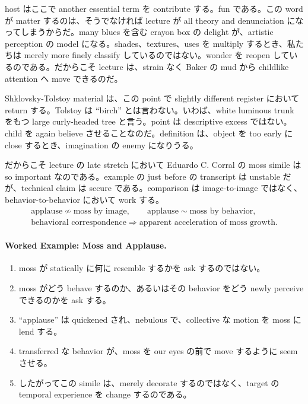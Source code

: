 host はここで another essential term を contribute する。fun である。この word が matter するのは、そうでなければ lecture が all theory and denunciation になってしまうからだ。many blues を含む crayon box の delight が、artistic perception の model になる。shades、textures、uses を multiply するとき、私たちは merely more finely classify しているのではない。wonder を reopen しているのである。だからこそ lecture は、strain なく Baker の mud から childlike attention へ move できるのだ。

Shklovsky-Tolstoy material は、この point で slightly different register において return する。Tolstoy は ``birch'' とは言わない。いわば、white luminous trunk をもつ large curly-headed tree と言う。point は descriptive excess ではない。child を again believe させることなのだ。definition は、object を too early に close するとき、imagination の enemy になりうる。

だからこそ lecture の late stretch において Eduardo C. Corral の moss simile は so important なのである。example の just before の transcript は unstable だが、technical claim は secure である。comparison は image-to-image ではなく、behavior-to-behavior において work する。
\begin{align}
\text{applause} \not\sim \text{moss by image}, \qquad \text{applause} \sim \text{moss by behavior},\\
\text{behavioral correspondence} \Longrightarrow \text{apparent acceleration of moss growth}.
\end{align}

\paragraph{Worked Example: Moss and Applause.}
\begin{enumerate}
\item moss が statically に何に resemble するかを ask するのではない。
\item moss がどう behave するのか、あるいはその behavior をどう newly perceive できるのかを ask する。
\item ``applause'' は quickened され、nebulous で、collective な motion を moss に lend する。
\item transferred な behavior が、moss を our eyes の前で move するように seem させる。
\item したがってこの simile は、merely decorate するのではなく、target の temporal experience を change するのである。
\end{enumerate}

